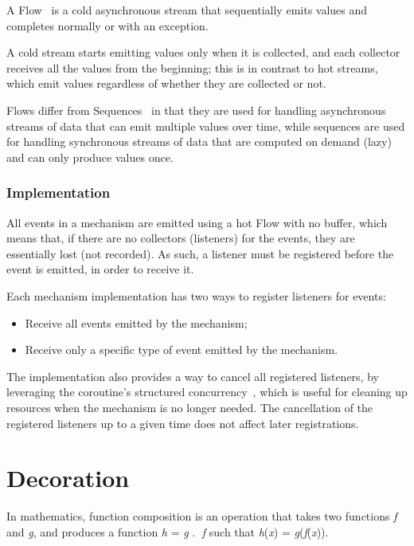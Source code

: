 A Flow~\cite{kotlin-flow} is a cold asynchronous stream that sequentially emits values and completes normally or with an exception.

A cold stream starts emitting values only when it is collected, and each collector receives all the values from the beginning; this is in contrast to hot streams, which emit values regardless of whether they are collected or not.

Flows differ from Sequences~\cite{kotlin-sequences} in that they are used for handling asynchronous streams of data that can emit multiple values over time, while sequences are used for handling synchronous streams of data that are computed on demand (lazy) and can only produce values once.

\subsubsection{Implementation}

All events in a mechanism are emitted using a hot Flow with no buffer, which means that, if there are no collectors (listeners) for the events, they are essentially lost (not recorded).
As such, a listener must be registered before the event is emitted, in order to receive it.

Each mechanism implementation has two ways to register listeners for events:

\begin{itemize}
    \item Receive all events emitted by the mechanism;
    \item Receive only a specific type of event emitted by the mechanism.
\end{itemize}

The implementation also provides a way to cancel all registered listeners, by leveraging the coroutine's structured concurrency~\cite{kotlin-coroutines}, which is useful for cleaning up resources when the mechanism is no longer needed.
The cancellation of the registered listeners up to a given time does not affect later registrations.


\section{Decoration}\label{sec:decoration}

In mathematics,
function composition is an operation that takes two functions \textit{f} and \textit{g}, and produces a function \textit{h} = \textit{g} \textcircled{.} \textit{f} such that \textit{h}(\textit{x}) = \textit{g}(\textit{f}(\textit{x})).

